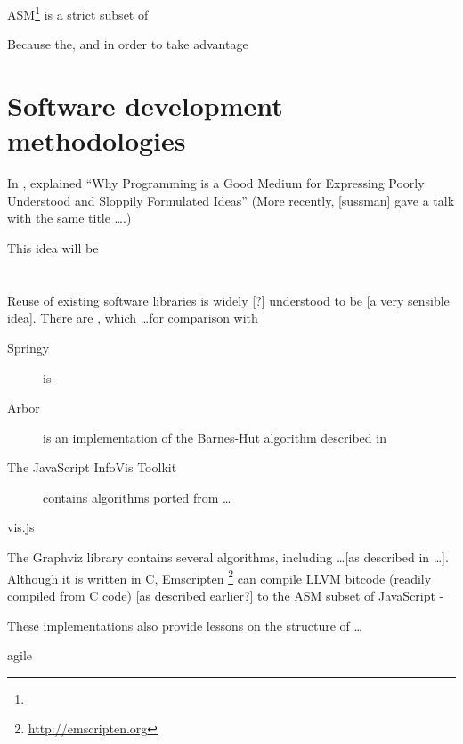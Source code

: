 ASM\footnote{} is a strict subset of 

Because the, and in order to take advantage


\section{Software development methodologies}

In \citeyear{67poorslop}, \citet*{67poorslop} explained ``Why Programming is a Good Medium for Expressing Poorly Understood and Sloppily Formulated Ideas''
(More recently, [sussman] gave a talk with the same title \ldots {}.)

This idea will be 


\section{}

Reuse of existing software libraries is widely [?] understood to be [a very sensible idea]. There are , which \ldots for comparison with 

\begin{description}
  \item[Springy] is 
  \item[Arbor] is an implementation of the Barnes-Hut algorithm described in  
  \item[The JavaScript InfoVis Toolkit] contains algorithms ported from \ldots
  \item[vis.js]
\end{description}

The Graphviz library contains several algorithms, including \ldots [as described in \ldots]. Although it is written in C, Emscripten \footnote{\url{http://emscripten.org}} can compile LLVM bitcode (readily compiled from C code) [as described earlier?] to the ASM subset of JavaScript -

These implementations also provide lessons on the structure of \ldots



agile





